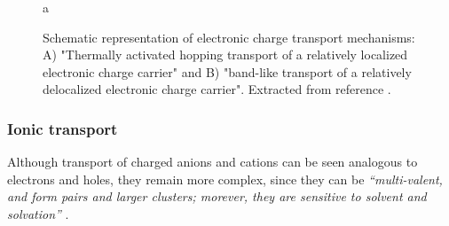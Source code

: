 

\begin{figure}[ht]
	\centering
	\hspace{2em}
	\caption{Schematic representation of electronic charge transport mechanisms: A) "Thermally activated hopping transport of a relatively localized electronic charge carrier" and B) "band-like transport of a relatively delocalized electronic charge carrier". Extracted from reference \cite{paulsenOrganicMixedIonic2020}.}a 
	\label{fig:etrans}
\end{figure}


\subsubsection{Ionic transport}
Although transport of charged anions and cations can be seen analogous to electrons and holes, they remain more complex, since they can be \textit{``multi-valent, and form pairs and larger clusters; morever, they are sensitive to solvent and solvation''} \cite{paulsenOrganicMixedIonic2020}.

